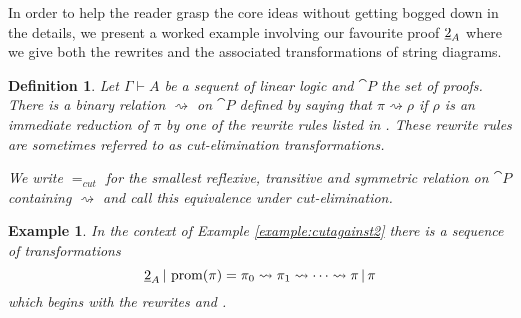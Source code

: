 \documentclass[english,letter paper,12pt,reqno]{article}
\theoremstyle{example}
\newtheorem{definition}[theorem]{Definition}
\newtheorem{example}[theorem]{Example}
\numberwithin{equation}{section}
\begin{document}
In order to help the reader grasp the core ideas without getting bogged down in the details, we present a worked example involving our favourite proof $\underline{2}_A$ where we give both the rewrites and the associated transformations of string diagrams.

\begin{definition} Let $\Gamma \vdash A$ be a sequent of linear logic and $\cat{P}$ the set of proofs. There is a binary relation $\rightsquigarrow$ on $\cat{P}$ defined by saying that $\pi \rightsquigarrow \rho$ if $\rho$ is an immediate reduction of $\pi$ by one of the rewrite rules listed in \cite[Section 3]{mellies}. These rewrite rules are sometimes referred to as \emph{cut-elimination transformations}.

We write $=_{cut}$ for the smallest reflexive, transitive and symmetric relation on $\cat{P}$ containing $\rightsquigarrow$ and call this \emph{equivalence under cut-elimination}.
\end{definition}


\begin{example}
In the context of Example \ref{example:cutagainst2} there is a sequence of transformations
\[
\underline{2}_A \,|\, \operatorname{prom}( \pi ) = \pi_0 \rightsquigarrow \pi_1 \rightsquigarrow \cdots \rightsquigarrow \pi \,|\, \pi
\]
which begins with the rewrites \cite[\S 3.9.3]{mellies} and \cite[\S 3.9.1]{mellies}.
\end{example}
\end{document}
